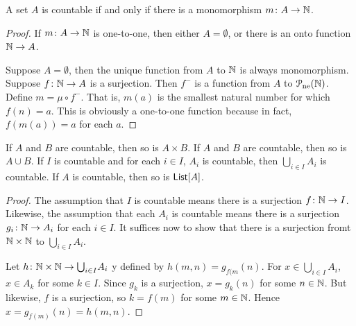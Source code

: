 \begin{lemma}
	A set $A$ is countable if and only if there is a monomorphism ${m}\colon{A}\to{\mathbb N}$. 
	
	\begin{proof}
		If ${m}\colon{A}\to{\mathbb N}$ is one-to-one, then either $A=\emptyset$, or there is an onto function $\mathbb N\to A$.
		
		Suppose $A=\emptyset$, then the unique function from $A$ to $\mathbb N$ is always monomorphism. Suppose ${f}\colon{\mathbb N}\to{A}$ is a surjection. Then 
		$f^-$ is a function from $A$ to ${\mathcal{P}}_{\text{ne}}(\mathbb N)$. Define $m = \mu\circ f^-$. That is, $m(a)$ is the smallest natural number for which $f(n)=a$. This is obviously a one-to-one function because in fact, $f(m(a))=a$ for each $a$.
	\end{proof}
\end{lemma}



\begin{lemma}
	If $A$ and $B$ are countable, then so is $A\times B$.
	If $A$ and $B$ are countable, then so is $A\cup B$.
	If $I$ is countable and for each $i\in I$, $A_i$ is countable, then $\bigcup_{i\in I}A_i$ is countable.
	If $A$ is countable, then so is $\mathord{\textsf{List}}[A]$.
	
	\begin{proof}
		The assumption that $I$ is countable means there is a surjection ${f}\colon{\mathbb N}\to{I}$. Likewise, the assumption that each $A_i$ is countable means there is a surjection ${g_i}\colon{\mathbb N}\to{A_i}$ for each $i\in I$. It suffices now to show that there is a surjection fromt $\mathbb N\times \mathbb N$ to $\bigcup_{i\in I}A_i$.
		
		Let ${h}\colon{\mathbb N\times \mathbb N}\to{\bigcup}_{i\in I}A_i$ y defined by $h(m,n) = g_{f(m}(n)$. For $x\in \bigcup_{i\in I}A_i$, $x\in  A_k$ for some $k\in I$. Since $g_k$ is a surjection, $x = g_k(n)$ for some $n\in\mathbb N$. 
		But likewise, $f$ is a surjection, so $k = f(m)$ for some $m\in\mathbb N$. 
		Hence $x = g_{f(m)}(n) = h(m,n)$.
	\end{proof}
\end{lemma}

